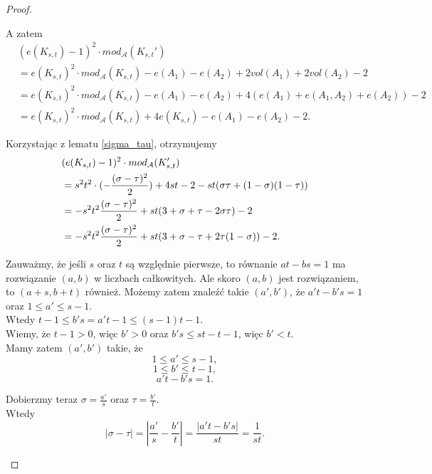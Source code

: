 \documentclass[letterpaper,12pt]{article}
\begin{document}
\begin{proof}
\begin{enumerate}
          A zatem
          \begin{align*}
             & (e(K_{s,t})-1)^2 \cdot mod_{\mathcal{A}}(K_{s,t}')                                           \\
             & = e(K_{s,t})^2 \cdot mod_{\mathcal{A}}(K_{s,t})-e(A_1)-e(A_2)+2vol(A_1)+2vol(A_2)-2          \\
             & = e(K_{s,t})^2 \cdot mod_{\mathcal{A}}(K_{s,t})-e(A_1)-e(A_2)+4(e(A_1)+e(A_1, A_2)+e(A_2))-2 \\
             & = e(K_{s,t})^2 \cdot mod_{\mathcal{A}}(K_{s,t}) + 4e(K_{s,t})-e(A_1)-e(A_2)-2.
          \end{align*}

          Korzystając z lematu \ref{sigma_tau}, otrzymujemy
          \begin{align}
             & (e(K_{s,t})-1)^2 \cdot mod_{\mathcal{A}}(K_{s,t}') \notag                                           \\
             & = s^2t^2 \cdot (-\frac{(\sigma-\tau)^2}{2}) + 4st - 2 - st(\sigma \tau + (1-\sigma)(1-\tau)) \notag \\
             & = -s^2t^2 \frac{(\sigma-\tau)^2}{2} + st(3 + \sigma + \tau - 2\sigma \tau) - 2 \notag               \\
             & = -s^2t^2 \frac{(\sigma-\tau)^2}{2} + st(3 + \sigma - \tau + 2\tau(1 - \sigma)) - 2. \label{modK}
          \end{align}

          Zauważmy, że jeśli \(s\) oraz \(t\) są względnie pierwsze, to równanie \(at - bs = 1\) ma rozwiązanie \((a,b)\) w liczbach całkowitych. Ale skoro \((a,b)\) jest rozwiązaniem, to \((a+s, b+t)\) również. Możemy zatem znaleźć takie \((a',b')\), że \(a't - b's = 1\) oraz \(1 \leq a' \leq s-1\).\\
          Wtedy \(t-1 \leq b's = a't-1 \leq (s-1)t-1\).\\
          Wiemy, że \(t-1 > 0\), więc \(b' > 0\) oraz \(b's \leq st-t-1\), więc \(b' < t\).\\
          Mamy zatem \((a',b')\) takie, że
          \[1 \leq a' \leq s-1,\]
          \[1 \leq b' \leq t-1,\]
          \[a't - b's = 1.\]

          Dobierzmy teraz \(\sigma = \frac{a'}{s}\) oraz \(\tau = \frac{b'}{t}\).\\
          Wtedy
          \[|\sigma - \tau| = |\frac{a'}{s} - \frac{b'}{t}| = \frac{|a't - b's|}{st} = \frac{1}{st}.\]


\end{enumerate}
\end{proof}
\end{document}
